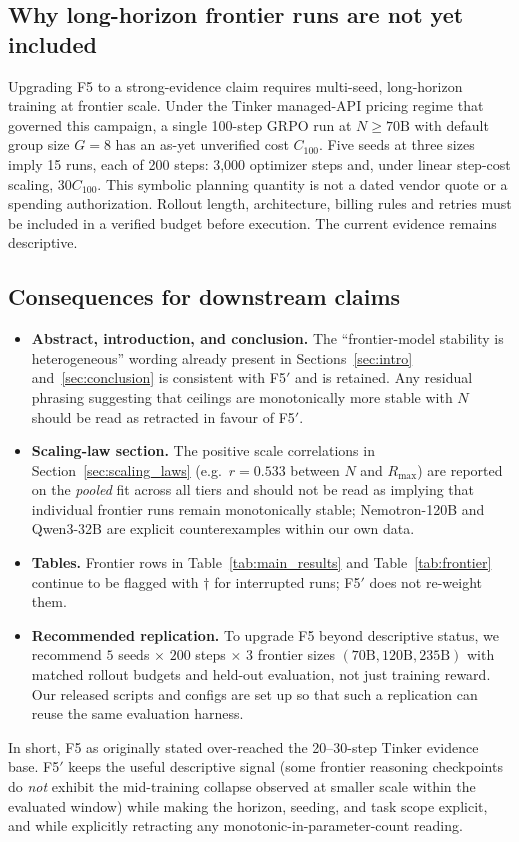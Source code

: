 \subsection{Why long-horizon frontier runs are not yet included}

Upgrading F5 to a strong-evidence claim requires multi-seed, long-horizon
training at frontier scale. Under the Tinker managed-API pricing regime that
governed this campaign, a single 100-step GRPO run at $N\geq 70\mathrm{B}$
with default group size $G=8$ has an as-yet unverified cost $C_{100}$.
Five seeds at three sizes imply 15 runs, each of 200 steps: 3,000 optimizer
steps and, under linear step-cost scaling, $30C_{100}$. This symbolic planning
quantity is not a dated vendor quote or a spending authorization. Rollout
length, architecture, billing rules and retries must be included in a verified
budget before execution. The current evidence remains descriptive.

\subsection{Consequences for downstream claims}

\begin{itemize}
    \item \textbf{Abstract, introduction, and conclusion.} The ``frontier-model
    stability is heterogeneous'' wording already present in
    Sections~\ref{sec:intro} and~\ref{sec:conclusion} is consistent with
    F5$'$ and is retained. Any residual phrasing suggesting that ceilings
    are monotonically more stable with $N$ should be read as retracted in
    favour of F5$'$.
    \item \textbf{Scaling-law section.} The positive scale correlations in
    Section~\ref{sec:scaling_laws} (e.g.\ $r=0.533$ between $N$ and
    $R_{\max}$) are reported on the \emph{pooled} fit across all tiers and
    should not be read as implying that individual frontier runs remain
    monotonically stable; Nemotron-120B and Qwen3-32B are explicit
    counterexamples within our own data.
    \item \textbf{Tables.} Frontier rows in Table~\ref{tab:main_results} and
    Table~\ref{tab:frontier} continue to be flagged with $\dagger$ for
    interrupted runs; F5$'$ does not re-weight them.
    \item \textbf{Recommended replication.} To upgrade F5 beyond descriptive
    status, we recommend $5$ seeds $\times$ $200$ steps $\times$ $3$
    frontier sizes $(70\mathrm{B}, 120\mathrm{B}, 235\mathrm{B})$ with
    matched rollout budgets and held-out evaluation, not just training
    reward. Our released scripts and configs are set up so that such a
    replication can reuse the same evaluation harness.
\end{itemize}

In short, F5 as originally stated over-reached the 20--30-step Tinker evidence
base. F5$'$ keeps the useful descriptive signal (some frontier reasoning
checkpoints do \emph{not} exhibit the mid-training collapse observed at
smaller scale within the evaluated window) while making the horizon, seeding,
and task scope explicit, and while explicitly retracting any
monotonic-in-parameter-count reading.
